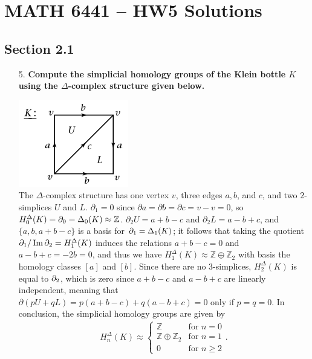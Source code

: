 \documentclass[a4paper,12pt]{article}
\DeclareMathOperator{\im}{Im}
\let\ker\relax %
\DeclareMathOperator{\ker}{Ker}
\begin{document}
\section*{MATH 6441 -- HW5 Solutions}
\subsection*{Section 2.1}
\begin{enumerate}
    \item[5.]
        \boldmath\textbf{Compute the simplicial homology groups of the Klein bottle $K$ using the $\Delta$-complex structure given below.
        }\unboldmath \par
        {\centering
            \includegraphics[scale=1]{klein_delta}
        \\}
        The $\Delta$-complex structure has one vertex $v$, three edges $a, b$, and $c$, and two $2$-simplices $U$ and $L$. $\partial_1 = 0$ since $\partial a = \partial b = \partial c = v - v = 0$, so $H_0^\Delta(K) = \ker\partial_0 = \Delta_0(K) \approx \mathbb{Z}$. $\partial_2 U = a + b - c$ and $\partial_2 L = a - b + c$, and $\{ a, b, a + b - c \}$ is a basis for $\ker\partial_1 = \Delta_1(K)$; it follows that taking the quotient $\ker\partial_1 / \im\partial_2 = H_1^\Delta(K)$ induces the relations $a + b - c = 0$ and $a - b + c = -2b = 0$, and thus we have $H_1^\Delta(K) \approx \mathbb{Z} \oplus \mathbb{Z}_2$ with basis the homology classes $[a]$ and $[b]$. Since there are no 3-simplices, $H_2^\Delta(K)$ is equal to $\ker\partial_2$, which is zero since $a + b - c$ and $a - b + c$ are linearly independent, meaning that $\partial(pU + qL) = p(a + b - c) + q(a - b + c) = 0$ only if $p = q = 0$. In conclusion, the simplicial homology groups are given by
        \begin{align*}
            H_n^\Delta(K) \approx \begin{cases}
                \mathbb{Z} &\text{for } n = 0 \\
                \mathbb{Z} \oplus \mathbb{Z}_2 &\text{for } n = 1 \\
                0 &\text{for } n \geq 2
            \end{cases}.
        \end{align*}


\end{enumerate}
\end{document}

